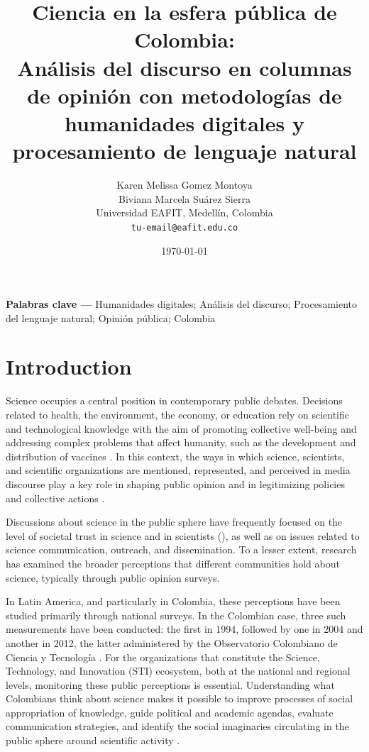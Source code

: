 \documentclass[11pt,a4paper]{article}
\title{Ciencia en la esfera pública de Colombia: \\
	Análisis del discurso en columnas de opinión con metodologías de humanidades digitales y procesamiento de lenguaje natural}
\author{
	Karen Melissa Gomez Montoya\\
	Biviana Marcela Suárez Sierra\\
	\small Universidad EAFIT, Medellín, Colombia\\
	\small \texttt{tu-email@eafit.edu.co}
}
\date{\today}
\newcommand{\keywords}[1]{\par\noindent\textbf{Palabras clave —} #1}
\begin{document}
	\maketitle
	
	\begin{abstract}
		
	\end{abstract}
	
	\keywords{Humanidades digitales; Análisis del discurso; Procesamiento del lenguaje natural; Opinión pública; Colombia}
	

	\section{Introduction}
	
	Science occupies a central position in contemporary public debates. Decisions related to health, the environment, the economy, or education rely on scientific and technological knowledge with the aim of promoting collective well-being and addressing complex problems that affect humanity, such as the development and distribution of vaccines \cite{Chakravartty2022}. In this context, the ways in which science, scientists, and scientific organizations are mentioned, represented, and perceived in media discourse play a key role in shaping public opinion and in legitimizing policies and collective actions \cite{Mede2022}.
	
	Discussions about science in the public sphere have frequently focused on the level of societal trust in science and in scientists (\cite{Cologna2025, Sturgis2021, Mede2022}), as well as on issues related to science communication, outreach, and dissemination. To a lesser extent, research has examined the broader perceptions that different communities hold about science, typically through public opinion surveys.
	
	In Latin America, and particularly in Colombia, these perceptions have been studied primarily through national surveys. In the Colombian case, three such measurements have been conducted: the first in 1994, followed by one in 2004 and another in 2012, the latter administered by the Observatorio Colombiano de Ciencia y Tecnología \cite{Daza_Caicedo2014}. For the organizations that constitute the Science, Technology, and Innovation (STI) ecosystem, both at the national and regional levels, monitoring these public perceptions is essential. Understanding what Colombians think about science makes it possible to improve processes of social appropriation of knowledge, guide political and academic agendas, evaluate communication strategies, and identify the social imaginaries circulating in the public sphere around scientific activity \cite{Daza_Caicedo2014}.
	
\end{document}

